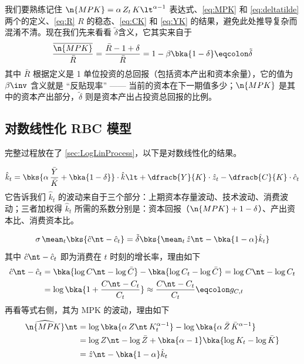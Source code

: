 我们要熟练记住 \(\n{MPK}=\alpha\,Z_t\,K\lt^{\alpha-1}\) 表达式、\ref{eq:MPK} 和 \ref{eq:deltatilde} 两个的定义、\ref{eq:R} \(R\) 的稳态、\ref{eq:CK} 和 \ref{eq:YK} 的结果，避免此处推导复杂而混淆不清。现在我们先来看看 \(\tilde\delta\)含义，它其实来自于
\begin{equation}
    \dfrac{\overline{\n{MPK}}}{\bar R}=\dfrac{\bar R-1+\delta}{\bar R}=1-\beta\bka{1-\delta}\eqcolon\tilde\delta\label{eq:deltatilde2}
\end{equation}
其中 \(\bar R\) 根据定义是 1 单位投资的总回报（包括资本产出和资本余量），它的值为 \(\beta\inv\) 含义就是 “反贴现率” —— 当前的资本在下一期值多少；\(\n{MPK}\) 是其中的资本产出部分，\(\tilde\delta\) 则是资本产出占投资总回报的比例。

\subsection{对数线性化 RBC 模型}\label{subsec:LogLinRBC}

完整过程放在了 \ref{sec:LogLinProcess}，以下是对数线性化的结果。

\begin{equation}
    \hat k_t=\bks{\alpha\,\dfrac{\bar Y}{\bar K}+\bka{1-\delta}}\cdot\hat k\lt+\dfracb{Y}{K}\cdot\hat z_t-\dfracb{C}{K}\cdot\hat c_t
\end{equation}
它告诉我们 \(\hat k_t\) 的波动来自于三个部分：上期资本存量波动、技术波动、消费波动；三者加权得 \(\hat k_t\) 所需的系数分别是：资本回报（\(\n{MPK}+1-\delta\)）、产出资本比、消费资本比。

\begin{equation}
    \sigma\,\mean_t\bks{\hat c\nt-\hat c_t}=\tilde\delta\bks{\mean_t\,\hat z\nt-\bka{1-\alpha}\hat k_t}
\end{equation}
其中 \(\hat c\nt-\hat c_t\) 即为消费在 \(t\) 时刻的增长率，理由如下
\begin{align*}
    \hat c\nt-\hat c_t&=\bka{\log C\nt-\log\bar C}-\bka{\log C_t-\log\bar C}=\log C\nt-\log C_t\\
    &=\log\bka{1+\dfrac{C\nt-C_t}{C_t}}\approx\dfrac{C\nt-C_t}{C_t}\eqcolon g_{C,t}
\end{align*}
再看等式右侧，其为 MPK 的波动，理由如下
\begin{align}
    \widehat{\n{MPK}}\nt &= \log\bka{\alpha\,Z\nt\,K_t^{\alpha-1}}-\log\bka{\alpha\,\bar Z\,\bar K^{\alpha-1}}\notag\\
    &=\log Z\nt-\log\bar Z+\bka{\alpha-1}\bka{\log K_t-\log\bar K}\notag\\
    &=\hat z\nt-\bka{1-\alpha}\hat k_t\label{eq:MPKhat}
\end{align}

